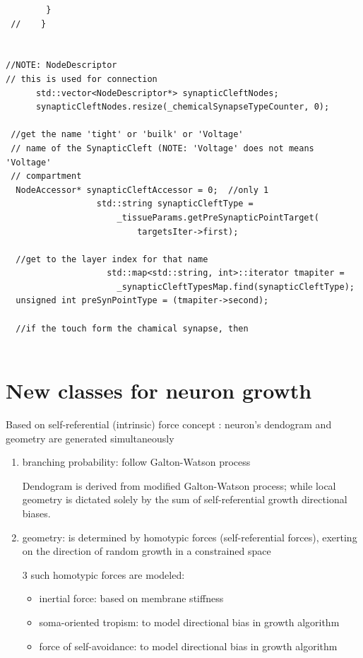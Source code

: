 \begin{verbatim}
        } 
 //    }


//NOTE: NodeDescriptor
// this is used for connection
      std::vector<NodeDescriptor*> synapticCleftNodes; 
      synapticCleftNodes.resize(_chemicalSynapseTypeCounter, 0);

 //get the name 'tight' or 'builk' or 'Voltage' 
 // name of the SynapticCleft (NOTE: 'Voltage' does not means 'Voltage'
 // compartment
  NodeAccessor* synapticCleftAccessor = 0;  //only 1
                  std::string synapticCleftType =
                      _tissueParams.getPreSynapticPointTarget(
                          targetsIter->first);
  
  //get to the layer index for that name
                    std::map<std::string, int>::iterator tmapiter =
                      _synapticCleftTypesMap.find(synapticCleftType);
  unsigned int preSynPointType = (tmapiter->second);
  
  //if the touch form the chamical synapse, then 
  
\end{verbatim}

\section{New classes for neuron growth}


Based on self-referential (intrinsic) force concept \citep{memelli2013}:
neuron's dendogram and geometry are generated simultaneously
\begin{enumerate}
  \item branching probability: follow Galton-Watson process
  
  Dendogram is derived from modified Galton-Watson process; while local geometry
  is dictated solely by the sum of self-referential growth directional biases.
  
  \item geometry: is determined by homotypic forces (self-referential forces),
  exerting on the direction of random growth in a constrained space
  
  3 such homotypic forces are modeled:
  \begin{itemize}
    \item inertial force: based on membrane stiffness
    \item soma-oriented tropism: to model directional bias in growth algorithm
    \item force of self-avoidance: to model directional bias in growth algorithm
  \end{itemize}
  
\end{enumerate}

